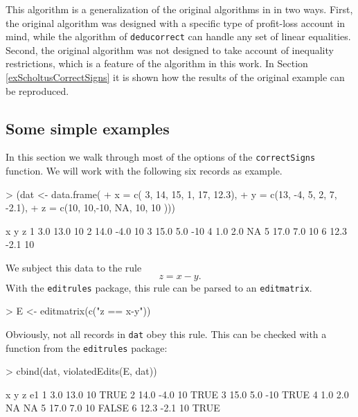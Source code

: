 \documentclass[11pt, fleqn, a4paper]{article}
\begin{document}
This algorithm is a generalization of the original algorithms in
\cite{scholtus:2008} in two ways. First, the original algorithm was designed
with a specific type of profit-loss account in mind, while the algorithm of
{\tt deducorrect} can handle any set of linear equalities. Second, the original
algorithm was not designed to take account of inequality restrictions, which is
a feature of the algorithm in this work. In Section
\ref{exScholtusCorrectSigns} it is shown how the results of the original
example can be reproduced.



%
%
\subsection{Some simple examples}
In this section we walk through most of the options of the {\tt correctSigns}
function.  We will work with the following six records as example.
\begin{Schunk}
\begin{Sinput}
> (dat <- data.frame(
+     x = c( 3, 14, 15,  1, 17, 12.3),
+     y = c(13, -4,  5,  2,  7, -2.1),
+     z = c(10, 10,-10, NA, 10, 10 )))
\end{Sinput}
\begin{Soutput}
     x    y   z
1  3.0 13.0  10
2 14.0 -4.0  10
3 15.0  5.0 -10
4  1.0  2.0  NA
5 17.0  7.0  10
6 12.3 -2.1  10
\end{Soutput}
\end{Schunk}
We subject this data to the rule
\begin{equation}
z = x-y.
\end{equation}
With the {\tt editrules} package, this rule can be parsed to an {\tt editmatrix}.
\begin{Schunk}
\begin{Sinput}
> E <- editmatrix(c("z == x-y"))
\end{Sinput}
\end{Schunk}
Obviously, not all records in {\tt dat} obey this rule. This can be checked with 
a function from the {\tt editrules} package:
\begin{Schunk}
\begin{Sinput}
> cbind(dat, violatedEdits(E, dat))
\end{Sinput}
\begin{Soutput}
     x    y   z    e1
1  3.0 13.0  10  TRUE
2 14.0 -4.0  10  TRUE
3 15.0  5.0 -10  TRUE
4  1.0  2.0  NA    NA
5 17.0  7.0  10 FALSE
6 12.3 -2.1  10  TRUE
\end{Soutput}
\end{Schunk}
\end{document}
